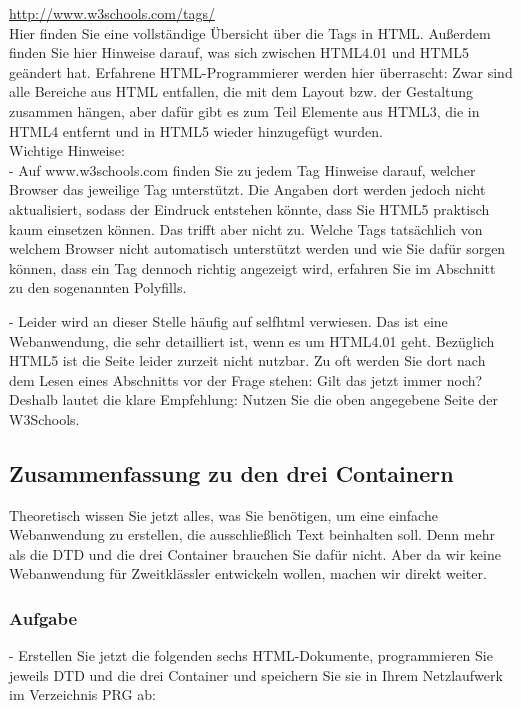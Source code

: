 \url{http://www.w3schools.com/tags/}\\

Hier finden Sie eine vollständige Übersicht über die Tags in HTML. Außerdem finden Sie hier Hinweise darauf, was sich zwischen HTML4.01 und HTML5 geändert hat. Erfahrene HTML-Programmierer werden hier überrascht: Zwar sind alle Bereiche aus HTML entfallen, die mit dem Layout bzw. der Gestaltung zusammen hängen, aber dafür gibt es zum Teil Elemente aus HTML3, die in HTML4 entfernt und in HTML5 wieder hinzugefügt wurden.\\

Wichtige Hinweise:\\

-	Auf www.w3schools.com finden Sie zu jedem Tag Hinweise darauf, welcher Browser das jeweilige Tag unterstützt. Die Angaben dort werden jedoch nicht aktualisiert, sodass der Eindruck entstehen könnte, dass Sie HTML5 praktisch kaum einsetzen können. Das trifft aber nicht zu. Welche Tags tatsächlich von welchem Browser nicht automatisch unterstützt werden und wie Sie dafür sorgen können, dass ein Tag dennoch richtig angezeigt wird, erfahren Sie im Abschnitt zu den sogenannten Polyfills.

-	Leider wird an dieser Stelle häufig auf selfhtml verwiesen. Das ist eine Webanwendung, die sehr detailliert ist, wenn es um HTML4.01 geht. Bezüglich HTML5 ist die Seite leider zurzeit nicht nutzbar. Zu oft werden Sie dort nach dem Lesen eines Abschnitts vor der Frage stehen: Gilt das jetzt immer noch? Deshalb lautet die klare Empfehlung: Nutzen Sie die oben angegebene Seite der W3Schools.

\subsection{Zusammenfassung zu den drei Containern}

Theoretisch wissen Sie jetzt alles, was Sie benötigen, um eine einfache Webanwendung zu erstellen, die ausschließlich Text beinhalten soll. Denn mehr als die DTD und die drei Container brauchen Sie dafür nicht. Aber da wir keine Webanwendung für Zweitklässler entwickeln wollen, machen wir direkt weiter.

\subsubsection{Aufgabe}

-	Erstellen Sie jetzt die folgenden sechs HTML-Dokumente, programmieren Sie jeweils DTD und die drei Container und speichern Sie sie in Ihrem Netzlaufwerk im Verzeichnis PRG ab:

